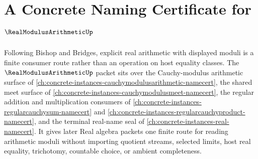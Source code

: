 \chapter{A Concrete Naming Certificate for $\RealModulusArithmeticUp$}
\label{ch:concrete-instances-real-modulus-arithmetic-namecert}

Following Bishop and Bridges, explicit real arithmetic with displayed moduli is a finite consumer route rather than an operation on host equality classes. The $\RealModulusArithmeticUp$ packet sits over the Cauchy-modulus arithmetic surface of \autoref{ch:concrete-instances-cauchymodulusarithmetic-namecert}, the shared meet surface of \autoref{ch:concrete-instances-cauchymodulusmeet-namecert}, the regular addition and multiplication consumers of \autoref{ch:concrete-instances-regularcauchysum-namecert} and \autoref{ch:concrete-instances-regularcauchyproduct-namecert}, and the terminal real-name seal of \autoref{ch:concrete-instances-real-namecert}. It gives later Real algebra packets one finite route for reading arithmetic moduli without importing quotient streams, selected limits, host real equality, trichotomy, countable choice, or ambient completeness.

